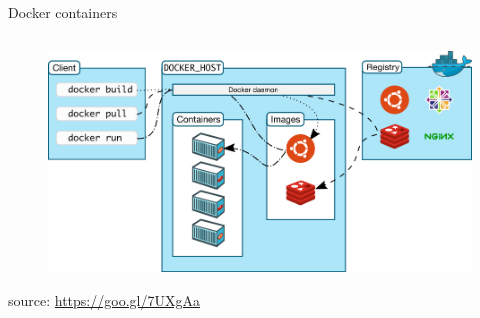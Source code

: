 \begin{frame}{Docker containers}
{\begin{columns}
\begin{column}{0.5\textwidth}
\begin{flushright}
				\end{flushright}
			\end{column}
		\end{columns}
	}
	{
		\begin{figure}
			\centering{}
			\includegraphics[scale=0.35]{images/docker-architecture.png}
		\end{figure}
		\begin{flushright}
			\tiny{source: \url{https://goo.gl/7UXgAa}}
		\end{flushright}
	}
\end{frame}